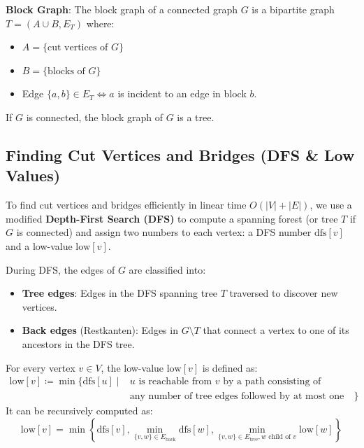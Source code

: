 \begin{definition}
	\textbf{Block Graph}: The block graph of a connected graph $G$ is a bipartite graph $T = (A \cup B, E_T)$ where:
	\begin{itemize}
		\item $A = \{\text{cut vertices of } G\}$
		\item $B = \{\text{blocks of } G\}$
		\item Edge $\{a, b\} \in E_T \iff a$ is incident to an edge in block $b$.
	\end{itemize}
\end{definition}

\begin{theorem}
	If $G$ is connected, the block graph of $G$ is a tree.
\end{theorem}

\subsection{Finding Cut Vertices and Bridges (DFS \& Low Values)}

To find cut vertices and bridges efficiently in linear time $O(|V| + |E|)$, we use a modified \textbf{Depth-First Search (DFS)} to compute a spanning forest (or tree $T$ if $G$ is connected) and assign two numbers to each vertex: a DFS number $\text{dfs}[v]$ and a low-value $\text{low}[v]$.

\begin{definition}
	During DFS, the edges of $G$ are classified into:
	\begin{itemize}
		\item \textbf{Tree edges}: Edges in the DFS spanning tree $T$ traversed to discover new vertices.
		\item \textbf{Back edges} (Restkanten): Edges in $G \setminus T$ that connect a vertex to one of its ancestors in the DFS tree.
	\end{itemize}
\end{definition}

\begin{definition}
	For every vertex $v \in V$, the low-value $\text{low}[v]$ is defined as:
	\begin{align*}
		\text{low}[v] \coloneqq \min \Big\{ \text{dfs}[u] \;\Big|\; & u \text{ is reachable from } v \text{ by a path consisting of}           \\
		                                                            & \text{any number of tree edges followed by at most one back edge} \Big\}
	\end{align*}
	It can be recursively computed as:
	$$\text{low}[v] = \min \left\{ \text{dfs}[v], \min_{\{v,w\} \in E_{\text{back}}} \text{dfs}[w], \min_{\{v,w\} \in E_{\text{tree}}, w \text{ child of } v} \text{low}[w] \right\}$$
\end{definition}

